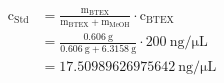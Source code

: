 \begin{align}
    \mathrm{c_{Std}} &=  \frac{\mathrm{m_{BTEX}}}{\mathrm{m_{BTEX}} + \mathrm{m_{MeOH}}} \cdot \mathrm{c_{BTEX}} \\
    &=  \frac{\mathrm{\SI[exponent-mode=threshold]{0.606}{\gram}}}{\mathrm{\SI[exponent-mode=threshold]{0.606}{\gram}} + \mathrm{\SI[exponent-mode=threshold]{6.3158}{\gram}}} \cdot \mathrm{\SI[exponent-mode=threshold]{200}{\nano\gram\per\micro\liter}} \\
    &=\SI[round-mode=figures, round-precision=4]{17.50989626975642}{\nano\gram\per\micro\liter}
\end{align}